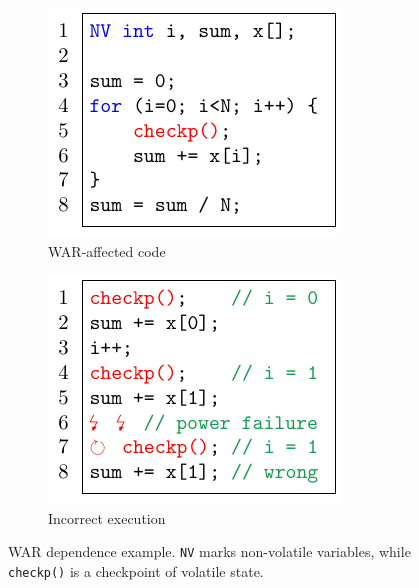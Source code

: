 \begin{figure}
    \begin{subfigure}{0.49\columnwidth}
        \includegraphics[width=\columnwidth]{figures/war-example.pdf}
        \caption{WAR-affected code}
        \label{fig:war-example}
    \end{subfigure}
    \begin{subfigure}{0.49\columnwidth}
        \includegraphics[width=\columnwidth]{figures/war-execution.pdf}
        \caption{Incorrect execution}
        \label{fig:war-execution}
    \end{subfigure}
    \caption{WAR dependence example. \texttt{NV} marks non-volatile variables,
    while \texttt{checkp()} is a checkpoint of volatile state.}
    \label{fig:war}
\end{figure}


